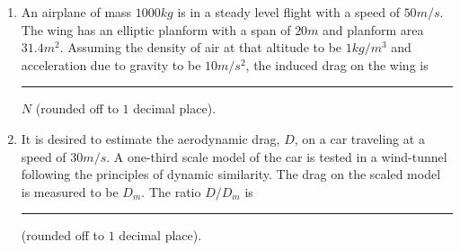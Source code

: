 \documentclass[journal]{IEEEtran}
\begin{document}
\begin{enumerate}



\item An airplane of mass $1000kg$ is in a steady level flight with a speed of $50m/s$. The wing has an elliptic planform with a span of $20m$ and planform area $31.4m^{2}$. Assuming the density of air at that altitude to be $1kg/m^{3}$ and acceleration due to gravity to be $10m/s^{2}$, the induced drag on the wing is \rule{1cm}{0.15mm} $N$ (rounded off to $1$ decimal place).


\item It is desired to estimate the aerodynamic drag, $D$, on a car traveling at a speed of $30m/s$. A one-third scale model of the car is tested in a wind-tunnel following the principles of dynamic similarity. The drag on the scaled model is measured to be $D_{m}$. The ratio $D/D_{m}$ is \rule{1cm}{0.15mm} (rounded off to $1$ decimal place).
\end{enumerate}
\end{document}
